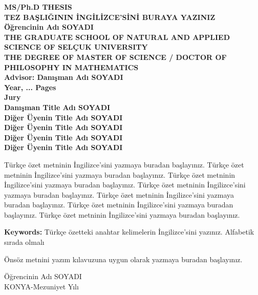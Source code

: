 \documentclass[12pt,oneside]{report}
\renewcommand{\thesisauthor}{Öğrencinin Adı SOYADI}    %
\renewcommand{\thesisyear}{Mezuniyet Yılı}    %
\renewcommand{\thesistitle}{TEZ BAŞLIĞININ İNGİLİZCE’SİNİ BURAYA YAZINIZ}
\renewcommand{\thesisauthoraddress}{KONYA}
\begin{document}
	\begin{thesisabstract}
		\begin{center}	
			\textbf{\MakeUppercase MS/Ph.D THESIS} \bigskip \\
			\textbf{\MakeUppercase \thesistitle}\bigskip \bigskip\\
			\textbf{\thesisauthor} \bigskip\\
			\textbf{THE GRADUATE SCHOOL OF  NATURAL AND APPLIED SCIENCE OF SELÇUK UNIVERSITY}\\
			\textbf{THE DEGREE OF  MASTER OF SCIENCE / DOCTOR OF PHILOSOPHY IN MATHEMATICS} %
                \bigskip\\
			\textbf{Advisor: Danışman Adı SOYADI}  %
   \bigskip\\
			\textbf{Year, ... Pages}\bigskip\\
			\bigskip
			\textbf{Jury} \\
			\textbf{Danışman Title Adı SOYADI} \\ %
			\textbf{Diğer Üyenin Title Adı SOYADI} \\
			\textbf{Diğer Üyenin Title Adı SOYADI} \\
			\textbf{Diğer Üyenin Title Adı SOYADI} \\
			\textbf{Diğer Üyenin Title Adı SOYADI} \\
		\end{center} \par
		\bigskip \bigskip
		\footnotesize Türkçe özet metninin İngilizce’sini yazmaya buradan başlayınız. Türkçe özet metninin İngilizce’sini yazmaya buradan başlayınız. Türkçe özet metninin İngilizce’sini yazmaya buradan başlayınız. Türkçe özet metninin İngilizce’sini yazmaya buradan başlayınız. Türkçe özet metninin İngilizce’sini yazmaya buradan başlayınız. Türkçe özet metninin İngilizce’sini yazmaya buradan başlayınız. Türkçe özet metninin İngilizce’sini yazmaya buradan başlayınız.  
		
		\footnotesize \textbf{Keywords:}  Türkçe özetteki anahtar kelimelerin İngilizce’sini yazınız. Alfabetik sırada olmalı
	\end{thesisabstract} 
	
	
	\begin{onsoz} 
		Önsöz metnini yazım kılavuzuna uygun olarak yazmaya buradan başlayınız.
		\begin{flushright} 
			\thesisauthor \\
			\thesisauthoraddress-\thesisyear
		\end{flushright}
	\end{onsoz}
	
\end{document}
